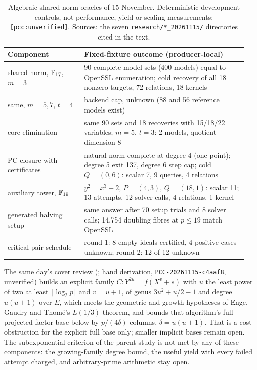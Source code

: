 \begin{table}[t]
\centering\small
\begin{tabular}{@{}p{0.30\linewidth}p{0.64\linewidth}@{}}
\toprule
Component & Fixed-fixture outcome (producer-local) \\
\midrule
shared norm, $\mathbb{F}_{17}$, $m=3$ & 90 complete model sets (400 models) equal to OpenSSL enumeration; cold recovery of all 18 nonzero targets, 72 relations, 18 kernels \\
same, $m=5,7$, $t=4$ & backend cap, unknown (88 and 56 reference models exist) \\
core elimination & same 90 sets and 18 recoveries with 15/18/22 variables; $m=5$, $t=3$: 2 models, quotient dimension 8 \\
PC closure with certificates & natural norm complete at degree 4 (one point); degree 5 exit 137, degree 6 step cap; cold $Q=(0,6)$: scalar 7, 9 queries, 4 relations \\
auxiliary tower, $\mathbb{F}_{19}$ & $y^2=x^3+2$, $P=(4,3)$, $Q=(18,1)$: scalar 11; 13 attempts, 12 solver calls, 4 relations, 1 kernel \\
generated halving setup & same answer after 70 setup trials and 8 solver calls; 14{,}754 doubling fibres at $p\le19$ match OpenSSL \\
critical-pair schedule & round 1: 8 empty ideals certified, 4 positive cases unknown; round 2: 12 of 12 unknown \\
\bottomrule
\end{tabular}
\caption[]{Algebraic shared-norm oracles of 15 November. Deterministic
development controls, not performance, yield or scaling measurements;
\texttt{[pcc:unverified]}. Sources: the seven \texttt{research/*\_20261115/}
directories cited in the text.}
\label{tab:pa-norm-oracles}
\end{table}

The same day's cover review (;
hand derivation, \texttt{PCC-20261115-c4aaf8}, unverified) builds an
explicit family $C:Y^{2u}=f(X^v+s)$ with $u$ the least power of two at
least $\lceil\log_2p\rceil$ and $v=u+1$, of genus $3u^2+u/2-1$ and degree
$u(u+1)$ over $E$, which meets the geometric and growth hypotheses of
Enge, Gaudry and Thom\'e's $L(1/3)$ theorem, and bounds that algorithm's full
projected factor base below by $p/(4\delta)$ columns, $\delta=u(u+1)$. That
is a cost obstruction for the explicit full base only; smaller implicit
bases remain open. The subexponential criterion of the parent study is not
met by any of these components: the growing-family degree bound, the useful
yield with every failed attempt charged, and arbitrary-prime arithmetic stay
open.

